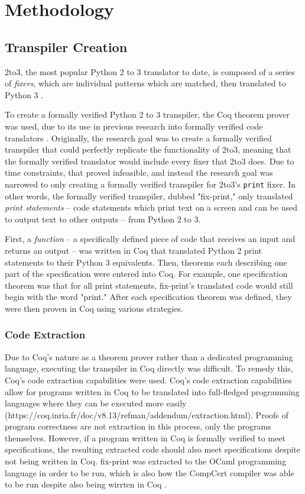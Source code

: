 \section{Methodology}

\subsection{Transpiler Creation}
2to3, the most popular Python 2 to 3 translator to date, is composed of a series of \textit{fixers}, which are individual patterns which are matched, then translated to Python 3 \autocite{2to3}.

To create a formally verified Python 2 to 3 transpiler, the Coq theorem prover was used, due to its use in previous research into formally verified code translators \autocite{Leroy}\autocite{Zhao}. Originally, the research goal was to create a formally verified transpiler that could perfectly replicate the functionality of 2to3, meaning that the formally verified translator would include every fixer that 2to3 does. Due to time constraints, that proved infeasible, and instead the research goal was narrowed to only creating a formally verified transpiler for 2to3's \verb|print| fixer. In other words, the formally verified transpiler, dubbed "fix-print," only translated \textit{print statements} -- code statements which print text on a screen and can be used to output text to other outputs -- from Python 2 to 3.

First, a \textit{function} -- a specifically defined piece of code that receives an input and returns an output --  was written in Coq that translated Python 2 print statements to their Python 3 equivalents. Then, theorems each describing one part of the specification were entered into Coq. For example, one specification theorem was that for all print statements, fix-print's translated code would still begin with the word "print." After each specification theorem was defined, they were then proven in Coq using various strategies.

\subsubsection{Code Extraction}
Due to Coq's nature as a theorem prover rather than a dedicated programming language, executing the transpiler in Coq directly was difficult. To remedy this, Coq's code extraction capabilities were used. Coq's code extraction capabilities allow for programs written in Coq to be translated into full-fledged programming languages where they can be executed more easily (https://coq.inria.fr/doc/v8.13/refman/addendum/extraction.html). Proofs of program correctness are not extraction in this process, only the programs themselves. However, if a program written in Coq is formally verified to meet specifications, the resulting extracted code should also meet specifications despite not being written in Coq. fix-print was extracted to the OCaml programming language in order to be run, which is also how the CompCert compiler was able to be run despite also being wirrten in Coq \autocite{Leroy}.

